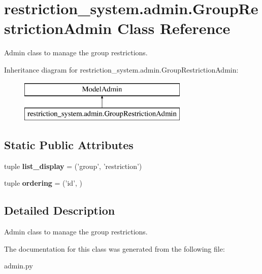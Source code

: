 \hypertarget{classrestriction__system_1_1admin_1_1GroupRestrictionAdmin}{}\section{restriction\+\_\+system.\+admin.\+Group\+Restriction\+Admin Class Reference}
\label{classrestriction__system_1_1admin_1_1GroupRestrictionAdmin}


Admin class to manage the group restrictions.  


Inheritance diagram for restriction\+\_\+system.\+admin.\+Group\+Restriction\+Admin\+:\begin{figure}[H]
\begin{center}
\leavevmode
\includegraphics[height=2.000000cm]{classrestriction__system_1_1admin_1_1GroupRestrictionAdmin}
\end{center}
\end{figure}
\subsection*{Static Public Attributes}
\begin{DoxyCompactItemize}
\item 
\hypertarget{classrestriction__system_1_1admin_1_1GroupRestrictionAdmin_aaf6ac5ba5b57b7d84c876a234a8943fa}{}tuple {\bfseries list\+\_\+display} = ('group', 'restriction')\label{classrestriction__system_1_1admin_1_1GroupRestrictionAdmin_aaf6ac5ba5b57b7d84c876a234a8943fa}

\item 
\hypertarget{classrestriction__system_1_1admin_1_1GroupRestrictionAdmin_ae38e83c42f0e70c4c314dd6989c69a5d}{}tuple {\bfseries ordering} = ('id', )\label{classrestriction__system_1_1admin_1_1GroupRestrictionAdmin_ae38e83c42f0e70c4c314dd6989c69a5d}

\end{DoxyCompactItemize}


\subsection{Detailed Description}
Admin class to manage the group restrictions. 



The documentation for this class was generated from the following file\+:\begin{DoxyCompactItemize}
\item 
admin.\+py\end{DoxyCompactItemize}

